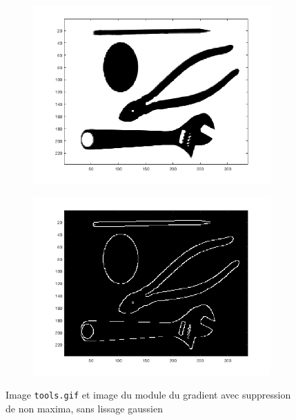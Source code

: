 \documentclass[a4paper]{article}
\begin{document}
\begin{figure}[H]
    \centering
    \begin{subfigure}[c]{0.46\textwidth}
        \centering
        \includegraphics[width=\textwidth]{images/tools.png}
    \end{subfigure}
    \begin{subfigure}[c]{0.46\textwidth}
        \centering
        \includegraphics[width=\textwidth]{images/tools_nms.png}
    \end{subfigure}
    \caption{Image \texttt{tools.gif} et image du module du gradient avec
    suppression de non maxima, sans lissage gaussien}
    \label{fig:tools-nms}
\end{figure}
\end{document}
